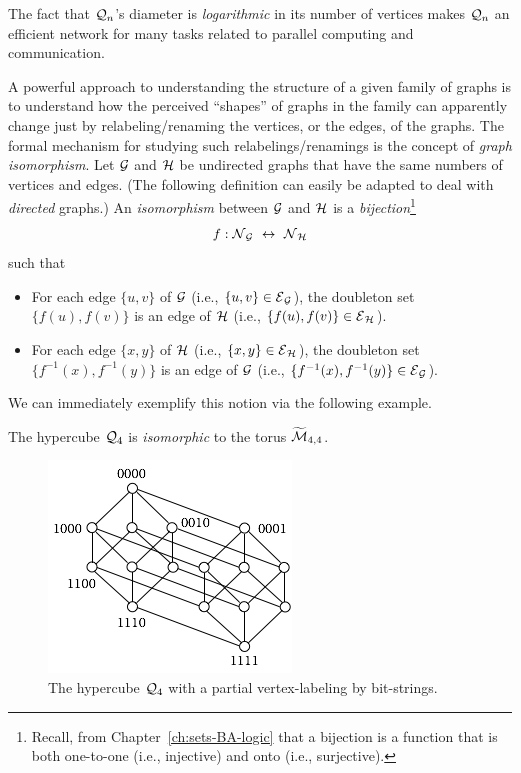 \medskip

The fact that $\mbox{$\cal Q$}_n$'s diameter is {\em logarithmic} in its number of vertices makes $\mbox{$\cal Q$}_n$ an efficient network for many tasks related to parallel computing and communication.

\bigskip


A powerful approach to understanding the structure of a given family of graphs is to understand how the perceived ``shapes'' of graphs in the family can apparently change just by relabeling/renaming the vertices, or the edges, of the graphs.  The formal mechanism for studying such
relabelings/renamings is the concept of {\it graph isomorphism}.  Let $\mbox{$\cal G$}$ and $\mbox{$\cal H$}$ be undirected graphs that have the same numbers of vertices and edges.  (The following definition can easily be adapted to deal with {\em directed} graphs.)  An {\it isomorphism} between $\mbox{$\cal G$}$ and $\mbox{$\cal H$}$ is a {\em bijection}\footnote{Recall, from Chapter~\ref{ch:sets-BA-logic} that a bijection is a function that is both one-to-one (i.e., injective) and onto (i.e., surjective).}
\[ f: \mbox{$\cal N$}_{\mbox{{\scriptsize $\cal G$}}} \ \leftrightarrow \ \mbox{$\cal N$}_{\mbox{{\scriptsize $\cal H$}}} \]
such that
\begin{itemize}
\item
For each edge $\{ u,v \}$ of $\mbox{$\cal G$}$ (i.e., $\{ u,v \} \in \mbox{$\cal E$}_{\mbox{{\scriptsize $\cal G$}}}$), the doubleton set $\{ f(u), f(v) \}$ is an edge of $\mbox{$\cal H$}$ (i.e., $\{ f(u), f(v) \} \in \mbox{$\cal E$}_{\mbox{{\scriptsize $\cal H$}}}$).
\medskip\item
For each edge $\{ x,y \}$ of $\mbox{$\cal H$}$ (i.e., $\{ x,y \} \in \mbox{$\cal E$}_{\mbox{{\scriptsize $\cal H$}}}$), the doubleton set $\{ f^{-1}(x), f^{-1}(y) \}$ is an edge of $\mbox{$\cal G$}$ (i.e., $\{ f^{-1}(x), f^{-1}(y) \} \in \mbox{$\cal E$}_{\mbox{{\scriptsize $\cal G$}}}$).
\end{itemize}
We can immediately exemplify this notion via the following example.

\begin{prop}
\label{prop.graphIsomorphism}
The hypercube $\mbox{$\cal Q$}_4$ is \textit{isomorphic} to the torus $\widetilde{\mbox{$\cal M$}}_{4,4}$.
\end{prop}

\begin{figure}[hbt]
\begin{center}
       \includegraphics[scale=0.6]{FiguresGraph/Isomorphism1}
       \caption{The hypercube $\mbox{$\cal Q$}_4$ with a partial vertex-labeling by bit-strings.}
  \label{fig:isomorphism1}
\end{center}
\end{figure}

